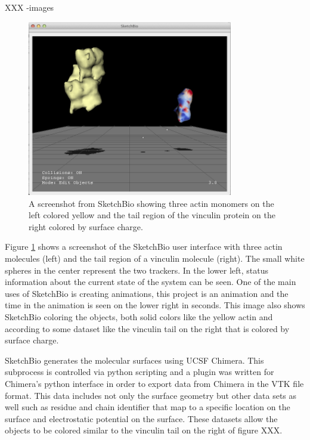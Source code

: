\documentclass{article} %
\begin{document}
XXX -images
\begin{figure}[t]
\centering
\includegraphics[width=0.8\textwidth]{actinVinculin.png}
\caption{A screenshot from SketchBio showing three actin monomers on the left colored yellow and the tail region of the vinculin protein on the right colored by surface charge.}
\label{fig:actin_vinculin}
\end{figure}

Figure \ref{fig:actin_vinculin} shows a screenshot of the SketchBio user interface with three actin molecules (left) and the tail region of a vinculin molecule (right).  The small white spheres in the center represent the two trackers.  In the lower left, status information about the current state of the system can be seen.  One of the main uses of SketchBio is creating animations, this project is an animation and the time in the animation is seen on the lower right in seconds.  This image also shows SketchBio coloring the objects, both solid colors like the yellow actin and according to some dataset like the vinculin tail on the right that is colored by surface charge.

SketchBio generates the molecular surfaces using UCSF Chimera.  This subprocess is controlled via python scripting and a plugin was written for Chimera’s python interface in order to export data from Chimera in the VTK file format.  This data includes not only the surface geometry but other data sets as well such as residue and chain identifier that map to a specific location on the surface and electrostatic potential on the surface.  These datasets allow the objects to be colored similar to the vinculin tail on the right of figure XXX.
\end{document}
